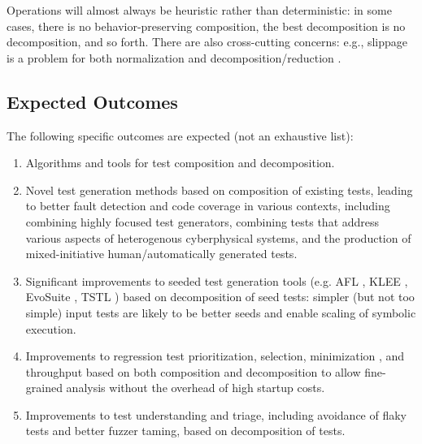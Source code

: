 Operations will almost always be heuristic rather than deterministic:
in some cases, there is no behavior-preserving composition, the best
decomposition is no decomposition, and so forth.  There are also
cross-cutting concerns:  e.g., slippage is a problem for both
normalization and decomposition/reduction \cite{slippageFSE}.

\subsection{Expected Outcomes}


The following specific outcomes are expected (not an exhaustive list):
\begin{enumerate}
\item Algorithms and tools for test composition and decomposition.
\item Novel test generation methods based on composition of existing
  tests,
  leading to better fault detection and code coverage in various
  contexts, including combining highly focused test generators,
  combining tests that address various aspects of heterogenous
  cyberphysical systems, and the production of mixed-initiative
  human/automatically generated tests.
\item Significant improvements to seeded test generation tools
  (e.g. AFL \cite{aflfuzz}, KLEE \cite{KLEE}, EvoSuite
  \cite{FA11}, TSTL \cite{NFM15}) based on decomposition of seed tests:  simpler
  (but not too simple)
  input tests are likely to be better seeds and enable scaling of
  symbolic execution.
\item Improvements to regression test prioritization, selection,
  minimization \cite{YooHarman}, and
  throughput based on both composition and decomposition to allow
  fine-grained analysis without the overhead of high startup costs.
\item Improvements to test understanding and triage, including
  avoidance of flaky tests and better fuzzer taming, based on
  decomposition of tests.
\end{enumerate}

